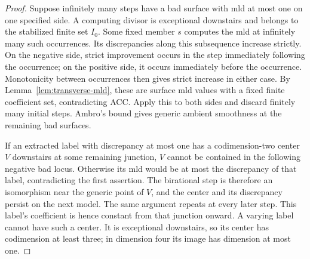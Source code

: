 \begin{proof}
Suppose infinitely many steps have a bad surface with mld at most one on one specified side. A computing divisor is exceptional downstairs and belongs to the stabilized finite set $I_0$. Some fixed member $s$ computes the mld at infinitely many such occurrences. Its discrepancies along this subsequence increase strictly. On the negative side, strict improvement occurs in the step immediately following the occurrence; on the positive side, it occurs immediately before the occurrence. Monotonicity between occurrences then gives strict increase in either case. By Lemma~\ref{lem:transverse-mld}, these are surface mld values with a fixed finite coefficient set, contradicting ACC. Apply this to both sides and discard finitely many initial steps. Ambro's bound gives generic ambient smoothness at the remaining bad surfaces.

If an extracted label with discrepancy at most one has a codimension-two center $V$ downstairs at some remaining junction, $V$ cannot be contained in the following negative bad locus. Otherwise its mld would be at most the discrepancy of that label, contradicting the first assertion. The birational step is therefore an isomorphism near the generic point of $V$, and the center and its discrepancy persist on the next model. The same argument repeats at every later step. This label's coefficient is hence constant from that junction onward. A varying label cannot have such a center. It is exceptional downstairs, so its center has codimension at least three; in dimension four its image has dimension at most one.
\end{proof}
